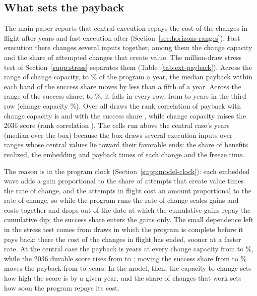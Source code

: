 \subsection{What sets the payback}\label{supp:ext-payback}
The main paper reports that central execution repays the cost of the changes in flight after \PayBackCen{} years and fast execution after \PayBackFast{} (Section~\ref{sec:horizons-ranges}). Fast execution there changes several inputs together, among them the change capacity and the share of attempted changes that create value. The million-draw stress test of Section~\ref{supp:stress} separates them (Table~\ref{tab:ext-payback}). Across the range of change capacity, \ExKapLo{} to \ExKapHi\% of the program a year, the median payback within each band of the success share moves by less than a fifth of a year. Across the range of the success share, \ExWinLo{} to \ExWinHi\%, it falls in every row, from \ExPbLowWin{} to \ExPbHighWin{} years in the third row (change capacity \ExPbRowLab\%). Over all draws the rank correlation of payback with change capacity is \ExRhoKap{} and with the success share \ExRhoWin{}, while change capacity raises the 2036 score (rank correlation \ExRhoKapScore). The cells run above the central case's \PayBackCen{} years (median \ExPbBoxMed{} over the box) because the box draws several execution inputs over ranges whose central values lie toward their favorable ends: the share of benefits realized, the embedding and payback times of each change and the freeze time.



The reason is in the program clock (Section~\ref{supp:model-clock}): each embedded wave adds a gain proportional to the share of attempts that create value times the rate of change, and the attempts in flight cost an amount proportional to the rate of change, so while the program runs the rate of change scales gains and costs together and drops out of the date at which the cumulative gains repay the cumulative dip; the success share enters the gains only. The small dependence left in the stress test comes from draws in which the program is complete before it pays back: there the cost of the changes in flight has ended, sooner at a faster rate. At the central case the payback is \ExPbCen{} years at every change capacity from \ExKapLo{} to \ExKapHi\%, while the 2036 durable score rises from \ExScoreKapLo{} to \ExScoreKapHi; moving the success share from \ExWinLo{} to \ExWinHi\% moves the payback from \ExPbWinLoCen{} to \ExPbWinHiCen{} years. In the model, then, the capacity to change sets how high the score is by a given year, and the share of changes that work sets how soon the program repays its cost.

